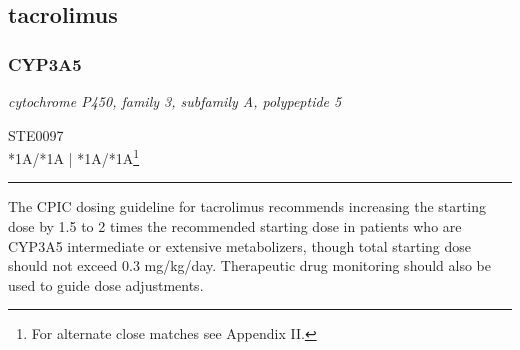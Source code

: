 \documentclass{report}
\begin{document}
      \normalsize











\subsection{ tacrolimus }

\subsubsection{ CYP3A5 }
     \textit{ cytochrome P450, family 3, subfamily A, polypeptide 5 } \begin{flushright} \textsc{ STE0097 \\ *1A/*1A  | *1A/*1A\footnote{For alternate close matches see Appendix II.} }\end{flushright}
      \hrule \vspace{6pt}
      The CPIC dosing guideline for tacrolimus recommends increasing the starting dose by 1.5 to 2 times the recommended starting dose in patients who are CYP3A5 intermediate or extensive metabolizers, though total starting dose should not exceed 0.3 mg/kg/day. Therapeutic drug monitoring should also be used to guide dose adjustments. \newline
      \scriptsize
      
\end{document}
